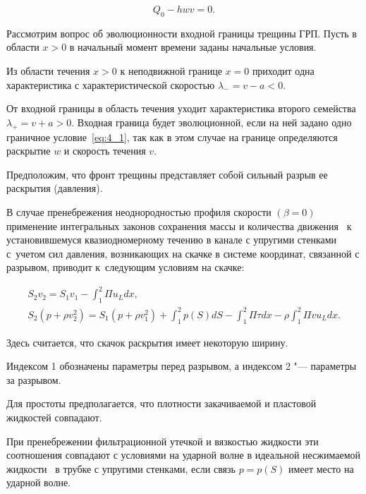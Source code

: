 \begin{equation}

Q_0 - hwv = 0.

\label{eq:4_1}

\end{equation}



Рассмотрим вопрос об эволюционности входной границы трещины ГРП. Пусть в области $x > 0$ в начальный момент времени заданы начальные условия. 

Из области течения $x > 0$ к неподвижной границе $x = 0$ приходит одна характеристика с характеристической скоростью $\lambda_- = v-a<0$. 

От входной границы в область течения уходит характеристика второго семейства $\lambda_+ = v+a>0$. Входная граница будет эволюционной, если на ней задано одно граничное условие~\eqref{eq:4_1}, так как в этом случае на границе определяются раскрытие $w$ и скорость течения $v$. 



Предположим, что фронт трещины представляет собой сильный разрыв ее раскрытия (давления). 

В случае пренебрежения неоднородностью профиля скорости $(\beta = 0)$ применение интегральных законов сохранения массы и количества движения~\cite{Chern1} к установившемуся квазиодномерному течению в канале с упругими стенками с~учетом сил давления, возникающих на скачке в системе координат, связанной с разрывом, приводит к~следующим условиям на скачке:     

\begin{gather}

S_2 v_2 = S_1 v_1 -\int_{1}^{2} \Pi u_L dx,  \\

S_2 \left(p+\rho v_2^2\right)  = S_1 \left(p+\rho v_1^2\right) + \int_{1}^{2} p(S) dS -\int_{1}^{2}\Pi \tau dx - \rho \int_{1}^{2}\Pi v u_L dx.

\end{gather}

Здесь считается, что скачок раскрытия имеет некоторую ширину. 

Индексом 1 обозначены параметры перед разрывом, а индексом 2 "--- параметры за разрывом. 

Для простоты предполагается, что плотности закачиваемой и пластовой жидкостей совпадают.



При пренебрежении фильтрационной утечкой и вязкостью жидкости эти соотношения совпадают с условиями на ударной волне в идеальной несжимаемой жидкости~\cite{pedli1} в трубке с упругими стенками, если связь $p = p(S)$ имеет место на ударной волне. 



